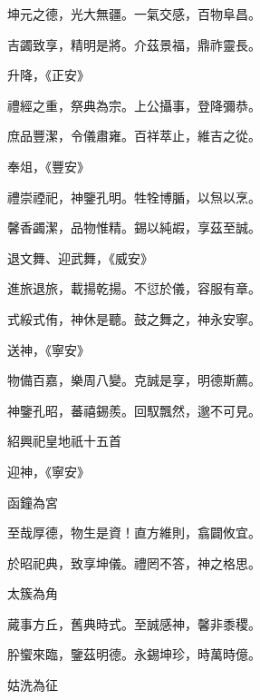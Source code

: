 \begin{pinyinscope}
 坤元之德，光大無疆。一氣交感，百物阜昌。



 吉蠲致享，精明是將。介茲景福，鼎祚靈長。



 升降，《正安》



 禮經之重，祭典為宗。上公攝事，登降彌恭。



 庶品豐潔，令儀肅雍。百祥萃止，維吉之從。



 奉俎，《豐安》



 禮崇禋祀，神鑒孔明。牲牷博腯，以炰以烹。



 馨香蠲潔，品物惟精。錫以純嘏，享茲至誠。



 退文舞、迎武舞，《威安》



 進旅退旅，載揚乾揚。不愆於儀，容服有章。



 式綏式侑，神休是聽。鼓之舞之，神永安寧。



 送神，《寧安》



 物備百嘉，樂周八變。克誠是享，明德斯薦。



 神鑒孔昭，蕃禧錫羨。回馭飄然，邈不可見。



 紹興祀皇地祇十五首



 迎神，《寧安》



 函鐘為宮



 至哉厚德，物生是資！直方維則，翕闢攸宜。



 於昭祀典，致享坤儀。禮罔不答，神之格思。



 太簇為角



 蕆事方丘，舊典時式。至誠感神，馨非黍稷。



 肸蠁來臨，鑒茲明德。永錫坤珍，時萬時億。



 姑洗為征




\end{pinyinscope}
